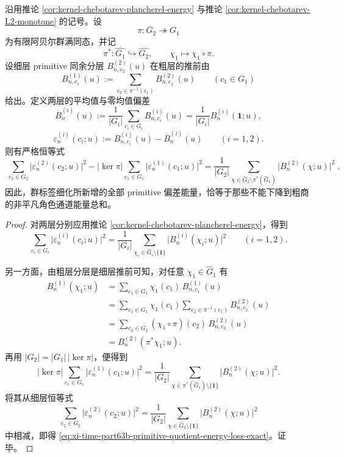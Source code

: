 \begin{theorem}\label{thm:xi-time-part63b-primitive-quotient-energy-loss-exact}
沿用推论 \ref{cor:kernel-chebotarev-plancherel-energy} 与推论 \ref{cor:kernel-chebotarev-L2-monotone} 的记号。设
\[
\pi:G_2\twoheadrightarrow G_1
\]
为有限阿贝尔群满同态，并记
\[
\pi^\ast:\widehat{G_1}\hookrightarrow \widehat{G_2},
\qquad
\chi_1\longmapsto \chi_1\circ\pi.
\]
设细层 primitive 同余分层 \(B_{n,c_2}^{(2)}(u)\) 在粗层的推前由
\[
B_{n,c_1}^{(1)}(u):=\sum_{c_2\in\pi^{-1}(c_1)}B_{n,c_2}^{(2)}(u)
\qquad(c_1\in G_1)
\]
给出。定义两层的平均值与零均值偏差
\[
\overline B_n^{(i)}(u)
:=
\frac{1}{|G_i|}\sum_{c_i\in G_i}B_{n,c_i}^{(i)}(u)
=
\frac{1}{|G_i|}B_n^{(i)}(\mathbf 1;u),
\]
\[
\varepsilon_n^{(i)}(c_i;u)
:=
B_{n,c_i}^{(i)}(u)-\overline B_n^{(i)}(u)
\qquad(i=1,2).
\]
则有严格恒等式
\begin{equation}\label{eq:xi-time-part63b-primitive-quotient-energy-loss-exact}
\boxed{\;
\sum_{c_2\in G_2}\bigl|\varepsilon_n^{(2)}(c_2;u)\bigr|^2
-
|\ker\pi|
\sum_{c_1\in G_1}\bigl|\varepsilon_n^{(1)}(c_1;u)\bigr|^2
=
\frac{1}{|G_2|}
\sum_{\chi\in \widehat G_2\setminus \pi^\ast(\widehat G_1)}
\bigl|B_n^{(2)}(\chi;u)\bigr|^2\; }.
\end{equation}
因此，群标签细化所新增的全部 primitive 偏差能量，恰等于那些不能下降到粗商的非平凡角色通道能量总和。
\end{theorem}
\begin{proof}
对两层分别应用推论 \ref{cor:kernel-chebotarev-plancherel-energy}，得到
\[
\sum_{c_i\in G_i}\bigl|\varepsilon_n^{(i)}(c_i;u)\bigr|^2
=
\frac{1}{|G_i|}
\sum_{\chi_i\in\widehat G_i\setminus\{\mathbf 1\}}
\bigl|B_n^{(i)}(\chi_i;u)\bigr|^2
\qquad(i=1,2).
\]

另一方面，由粗层分层是细层推前可知，对任意 \(\chi_1\in\widehat G_1\) 有
\[
\begin{aligned}
B_n^{(1)}(\chi_1;u)
&=
\sum_{c_1\in G_1}\chi_1(c_1)\,B_{n,c_1}^{(1)}(u)\\
&=
\sum_{c_1\in G_1}\chi_1(c_1)
\sum_{c_2\in\pi^{-1}(c_1)}B_{n,c_2}^{(2)}(u)\\
&=
\sum_{c_2\in G_2}(\chi_1\circ\pi)(c_2)\,B_{n,c_2}^{(2)}(u)\\
&=
B_n^{(2)}(\pi^\ast\chi_1;u).
\end{aligned}
\]
再用 \(|G_2|=|G_1|\,|\ker\pi|\)，便得到
\[
|\ker\pi|
\sum_{c_1\in G_1}\bigl|\varepsilon_n^{(1)}(c_1;u)\bigr|^2
=
\frac{1}{|G_2|}
\sum_{\chi\in \pi^\ast(\widehat G_1)\setminus\{\mathbf 1\}}
\bigl|B_n^{(2)}(\chi;u)\bigr|^2.
\]
将其从细层恒等式
\[
\sum_{c_2\in G_2}\bigl|\varepsilon_n^{(2)}(c_2;u)\bigr|^2
=
\frac{1}{|G_2|}
\sum_{\chi\in \widehat G_2\setminus\{\mathbf 1\}}
\bigl|B_n^{(2)}(\chi;u)\bigr|^2
\]
中相减，即得
\eqref{eq:xi-time-part63b-primitive-quotient-energy-loss-exact}。证毕。
\end{proof}

